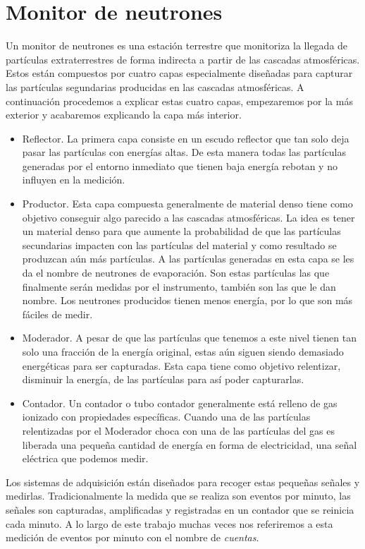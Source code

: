 \section{Monitor de neutrones}
	Un monitor de neutrones es una estación terrestre que monitoriza la llegada de partículas extraterrestres de forma indirecta a partir de las
	cascadas atmosféricas. Estos están compuestos por cuatro capas especialmente diseñadas para capturar las partículas segundarias producidas en
	las cascadas atmosféricas. A continuación procedemos a explicar estas cuatro capas, empezaremos por la más exterior y acabaremos explicando la
	capa más interior.
	\begin{itemize}
		\item	Reflector. La primera capa consiste en un escudo reflector que tan solo deja pasar las partículas con energías altas. De esta
			manera todas las partículas generadas por el entorno inmediato que tienen baja energía rebotan y no influyen en la medición.
		\item	Productor. Esta capa compuesta generalmente de material denso tiene como objetivo conseguir algo parecido a las cascadas
			atmosféricas. La idea es tener un material denso para que aumente la probabilidad de que las partículas secundarias impacten
			con las partículas del material y como resultado se produzcan aún más partículas. A las partículas generadas en esta capa se
			les da el nombre de neutrones de evaporación. Son estas partículas las que finalmente serán medidas por el instrumento,
			también son las que le dan nombre. Los neutrones producidos tienen menos energía, por lo que son más fáciles de medir.
		\item	Moderador. A pesar de que las partículas que tenemos a este nivel tienen tan solo una fracción de la energía original, estas
			aún siguen siendo demasiado energéticas para ser capturadas. Esta capa tiene como objetivo relentizar, disminuir la energía,
			de las partículas para así poder capturarlas.
		\item	Contador. Un contador o tubo contador generalmente está relleno de gas ionizado con propiedades específicas. Cuando una de
			las partículas relentizadas por el Moderador choca con una de las partículas del gas es liberada una pequeña cantidad de
			energía en forma de electricidad, una señal eléctrica que podemos medir. 
	\end{itemize}
	\par
	Los sistemas de adquisición están diseñados para recoger estas pequeñas señales y medirlas. Tradicionalmente la medida que se realiza son
	eventos por minuto, las señales son capturadas, amplificadas y registradas en un contador que se reinicia cada minuto. A lo largo de este
	trabajo muchas veces nos referiremos a esta medición de eventos por minuto con el nombre de \emph{cuentas}. 

